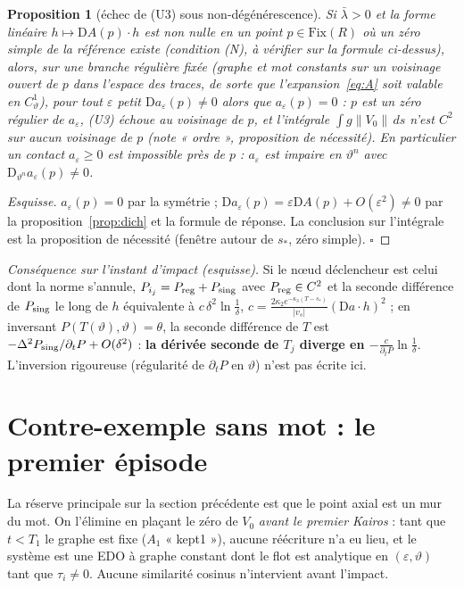 \documentclass[11pt,a4paper]{article}
\newtheorem{proposition}[theoreme]{Proposition}
\theoremstyle{remark}
\newcommand{\vth}{\vartheta}
\newcommand{\D}{\mathrm D}
\begin{document}
\begin{proposition}[échec de (U3) sous non-dégénérescence]\label{prop:aniso}
Si $\bar\lambda>0$ et la forme linéaire $h\mapsto\D A(p)\cdot h$ est non nulle en un point $p\in\mathrm{Fix}(R)$ où un zéro simple de la référence existe (condition (N), à vérifier sur la formule ci-dessus), alors, \emph{sur une branche régulière fixée} (graphe et mot constants sur un voisinage ouvert de $p$ dans l'espace des traces, de sorte que l'expansion~\eqref{eq:A} soit valable en $C^1_\vth$), pour tout $\varepsilon$ petit $\D a_\varepsilon(p)\ne0$ alors que $a_\varepsilon(p)=0$ : $p$ est un zéro régulier de $a_\varepsilon$, (U3) échoue au voisinage de $p$, et l'intégrale $\int g\lVert V_0\rVert\,ds$ n'est $C^2$ sur aucun voisinage de $p$ (note « ordre », proposition de nécessité). En particulier un contact $a_\varepsilon\ge0$ est impossible près de $p$ : $a_\varepsilon$ est impaire en $\vth^n$ avec $\D_{\vth^n}a_\varepsilon(p)\ne0$.
\end{proposition}
\begin{proof}[Esquisse]
$a_\varepsilon(p)=0$ par la symétrie ; $\D a_\varepsilon(p)=\varepsilon\D A(p)+O(\varepsilon^2)\ne0$ par la proposition~\ref{prop:dich} et la formule de réponse. La conclusion sur l'intégrale est la proposition de nécessité (fenêtre autour de $s_*$, zéro simple). $\square$
\end{proof}
\noindent\emph{Conséquence sur l'instant d'impact (esquisse).} Si le nœud déclencheur est celui dont la norme s'annule, $P_{i_j}=P_{\rm reg}+P_{\rm sing}$ avec $P_{\rm reg}\in C^2$ et la seconde différence de $P_{\rm sing}$ le long de $h$ équivalente à $c\,\delta^2\ln\frac1\delta$, $c=\frac{2\kappa_2e^{-\kappa_3(T-s_*)}}{\lvert v_s\rvert}(\D a\cdot h)^2$ ; en inversant $P(T(\vth),\vth)=\theta$, la seconde différence de $T$ est $-\Delta^2P_{\rm sing}/\partial_tP+O(\delta^2)$ : \textbf{la dérivée seconde de $T_j$ diverge en $-\frac{c}{\partial_tP}\ln\frac1\delta$}. L'inversion rigoureuse (régularité de $\partial_tP$ en $\vth$) n'est pas écrite ici.

\section{Contre-exemple sans mot : le premier épisode}\label{sec:premier}
La réserve principale sur la section précédente est que le point axial est un mur du mot. On l'élimine en plaçant le zéro de $V_0$ \emph{avant le premier Kairos} : tant que $t<T_1$ le graphe est fixe ($A_1$ « kept1 »), aucune réécriture n'a eu lieu, et le système est une EDO à graphe constant dont le flot est analytique en $(\varepsilon,\vth)$ tant que $\tau_i\ne0$. Aucune similarité cosinus n'intervient avant l'impact.
\end{document}
